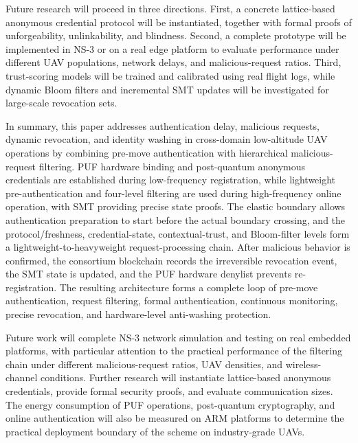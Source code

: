 \documentclass[lettersize,journal]{IEEEtran}
\begin{document}
	Future research will proceed in three directions. First, a concrete lattice-based anonymous credential protocol will be instantiated, together with formal proofs of unforgeability, unlinkability, and blindness. Second, a complete prototype will be implemented in NS-3 or on a real edge platform to evaluate performance under different UAV populations, network delays, and malicious-request ratios. Third, trust-scoring models will be trained and calibrated using real flight logs, while dynamic Bloom filters and incremental SMT updates will be investigated for large-scale revocation sets.
	
	In summary, this paper addresses authentication delay, malicious requests, dynamic revocation, and identity washing in cross-domain low-altitude UAV operations by combining pre-move authentication with hierarchical malicious-request filtering. PUF hardware binding and post-quantum anonymous credentials are established during low-frequency registration, while lightweight pre-authentication and four-level filtering are used during high-frequency online operation, with SMT providing precise state proofs. The elastic boundary allows authentication preparation to start before the actual boundary crossing, and the protocol/freshness, credential-state, contextual-trust, and Bloom-filter levels form a lightweight-to-heavyweight request-processing chain. After malicious behavior is confirmed, the consortium blockchain records the irreversible revocation event, the SMT state is updated, and the PUF hardware denylist prevents re-registration. The resulting architecture forms a complete loop of pre-move authentication, request filtering, formal authentication, continuous monitoring, precise revocation, and hardware-level anti-washing protection.
	
	Future work will complete NS-3 network simulation and testing on real embedded platforms, with particular attention to the practical performance of the filtering chain under different malicious-request ratios, UAV densities, and wireless-channel conditions. Further research will instantiate lattice-based anonymous credentials, provide formal security proofs, and evaluate communication sizes. The energy consumption of PUF operations, post-quantum cryptography, and online authentication will also be measured on ARM platforms to determine the practical deployment boundary of the scheme on industry-grade UAVs.
	
\end{document}

